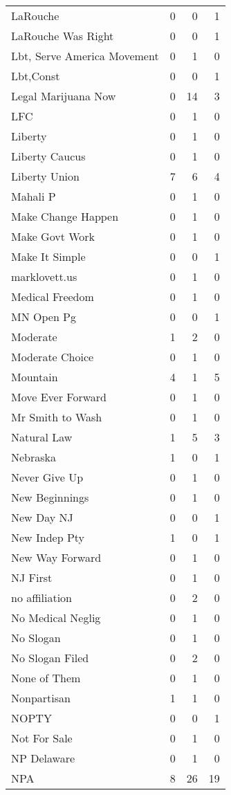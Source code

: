 \begin{supertabular}{lrrr}
LaRouche & 0 & 0 & 1\\
LaRouche Was Right & 0 & 0 & 1\\
Lbt, Serve America Movement & 0 & 1 & 0\\
Lbt,Const & 0 & 0 & 1\\
Legal Marijuana Now & 0 & 14 & 3\\
LFC & 0 & 1 & 0\\
Liberty & 0 & 1 & 0\\
Liberty Caucus & 0 & 1 & 0\\
Liberty Union & 7 & 6 & 4\\
Mahali P & 0 & 1 & 0\\
Make Change Happen & 0 & 1 & 0\\
Make Govt Work & 0 & 1 & 0\\
Make It Simple & 0 & 0 & 1\\
marklovett.us & 0 & 1 & 0\\
Medical Freedom & 0 & 1 & 0\\
MN Open Pg & 0 & 0 & 1\\
Moderate & 1 & 2 & 0\\
Moderate Choice & 0 & 1 & 0\\
Mountain & 4 & 1 & 5\\
Move Ever Forward & 0 & 1 & 0\\
Mr Smith to Wash & 0 & 1 & 0\\
Natural Law & 1 & 5 & 3\\
Nebraska & 1 & 0 & 1\\
Never Give Up & 0 & 1 & 0\\
New Beginnings & 0 & 1 & 0\\
New Day NJ & 0 & 0 & 1\\
New Indep Pty & 1 & 0 & 1\\
New Way Forward & 0 & 1 & 0\\
NJ First & 0 & 1 & 0\\
no  affiliation & 0 & 2 & 0\\
No Medical Neglig & 0 & 1 & 0\\
No Slogan & 0 & 1 & 0\\
No Slogan Filed & 0 & 2 & 0\\
None of Them & 0 & 1 & 0\\
Nonpartisan & 1 & 1 & 0\\
NOPTY & 0 & 0 & 1\\
Not For Sale & 0 & 1 & 0\\
NP Delaware & 0 & 1 & 0\\
NPA & 8 & 26 & 19\\

\end{supertabular}
